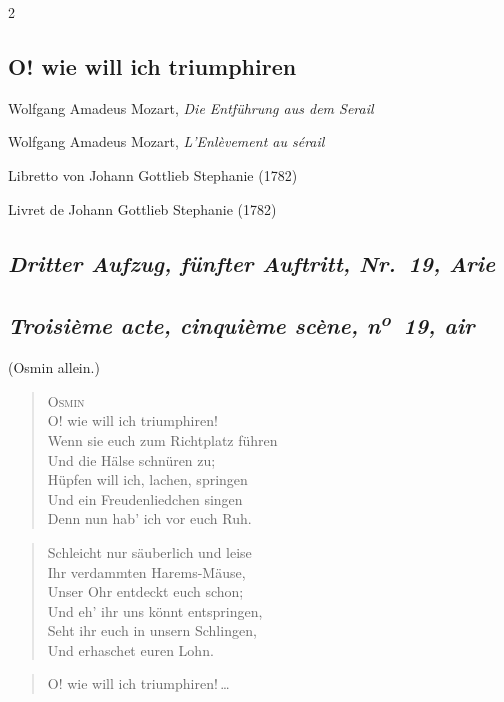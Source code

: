 \documentclass[a4paper,12pt]{article}
\newcommand\chunks[2]{%
\begin{leftcolumn*}\begin{otherlanguage}{german}%
{#1}%
\end{otherlanguage}\end{leftcolumn*}%
\begin{rightcolumn}\begin{otherlanguage}{french}%
{#2}%
\end{otherlanguage}\end{rightcolumn}%
}
\newcommand\strophe[1]{\subsection*{\normalsize\normalfont\itshape #1}}
\begin{document}
\thispagestyle{empty}
\setlength{\columnsep}{8mm}


\begin{paracol}{2}

  \chunks{\section*{O! wie will ich triumphiren}}
         {}

  \chunks{\noindent\raggedright\small Wolfgang Amadeus Mozart, \textit{Die Entführung aus dem Serail}}
         {\noindent\raggedright\small Wolfgang Amadeus Mozart, \textit{L’Enlèvement au sérail}}

  \chunks{\noindent\raggedright\small Libretto von Johann Gottlieb Stephanie (1782)}
         {\noindent\raggedright\small Livret de Johann Gottlieb Stephanie (1782)}

  \chunks{\strophe{Dritter Aufzug, fünfter Auftritt, Nr.~19, Arie}}
         {\strophe{Troisième acte, cinquième scène, n\textsuperscript{o}~19, air}}

  \chunks{\noindent\small(Osmin allein.)}
         {}

  \chunks{\begin{verse}
          \textsc{Osmin}\\[\medskipamount]
          O! wie will ich triumphiren!\\
          Wenn sie euch zum Richtplatz führen\\
          Und die Hälse schnüren zu;\\
          Hüpfen will ich, lachen, springen\\
          Und ein Freudenliedchen singen\\
          Denn nun hab’ ich vor euch Ruh.
          \end{verse}}
         {}

  \chunks{\begin{verse}
          Schleicht nur säuberlich und leise\\
          Ihr verdammten Harems-Mäuse,\\
          Unser Ohr entdeckt euch schon;\\
          Und eh’ ihr uns könnt entspringen,\\
          Seht ihr euch in unsern Schlingen,\\
          Und erhaschet euren Lohn.
          \end{verse}}
         {}

  \chunks{\begin{verse}
          O! wie will ich triumphiren!\,\dots{}
          \end{verse}}
         {}
\end{paracol}
\end{document}

